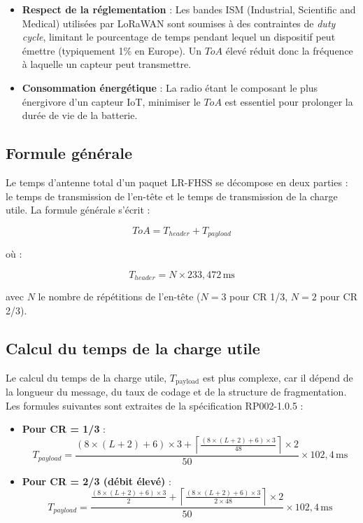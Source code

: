 \begin{itemize}
	\item \textbf{Respect de la réglementation} : Les bandes ISM (Industrial, Scientific and Medical) utilisées par LoRaWAN sont soumises à des contraintes de \textit{duty cycle}, limitant le pourcentage de temps pendant lequel un dispositif peut émettre (typiquement 1\% en Europe). Un $ToA$ élevé réduit donc la fréquence à laquelle un capteur peut transmettre.
	
	\item \textbf{Consommation énergétique} : La radio étant le composant le plus énergivore d'un capteur IoT, minimiser le $ToA$ est essentiel pour prolonger la durée de vie de la batterie.
\end{itemize}
\subsection{Formule générale}

Le temps d'antenne total d'un paquet LR-FHSS se décompose en deux parties : le temps de transmission de l'en-tête et le temps de transmission de la charge utile. La formule générale s'écrit :

\[ ToA = T_{header} + T_{payload} \]

où :

\[ T_{header} = N \times 233{,}472\,\text{ms} \]

avec $N$ le nombre de répétitions de l'en-tête ($N=3$ pour CR 1/3, $N=2$ pour CR 2/3).

\subsection{Calcul du temps de la charge utile}

Le calcul du temps de la charge utile, $T_{\text{payload}}$ est plus complexe, car il dépend de la longueur du message, du taux de codage et de la structure de fragmentation. Les formules suivantes sont extraites de la spécification RP002-1.0.5 \cite{loraalliance2025regional} :

\begin{itemize}
	\item \textbf{Pour CR = 1/3} :
	\begin{equation}
		\label{eq:toa1}
		 T_{payload} = \frac{(8 \times (L + 2) + 6) \times 3 + \left\lceil \frac{(8 \times (L + 2) + 6) \times 3}{48} \right\rceil \times 2}{50} \times 102{,}4\,\text{ms}
	\end{equation}
	
	
	\item \textbf{Pour CR = 2/3 (débit élevé)} :
	\begin{equation}
		\label{eq:toa2}
		 T_{payload} = \frac{\frac{(8 \times (L + 2) + 6) \times 3}{2} + \left\lceil \frac{(8 	\times (L + 2) + 6) \times 3}{2 \times 48} \right\rceil \times 2}{50} \times 102{,}4\,\text{ms} 
	\end{equation}
	
\end{itemize}

